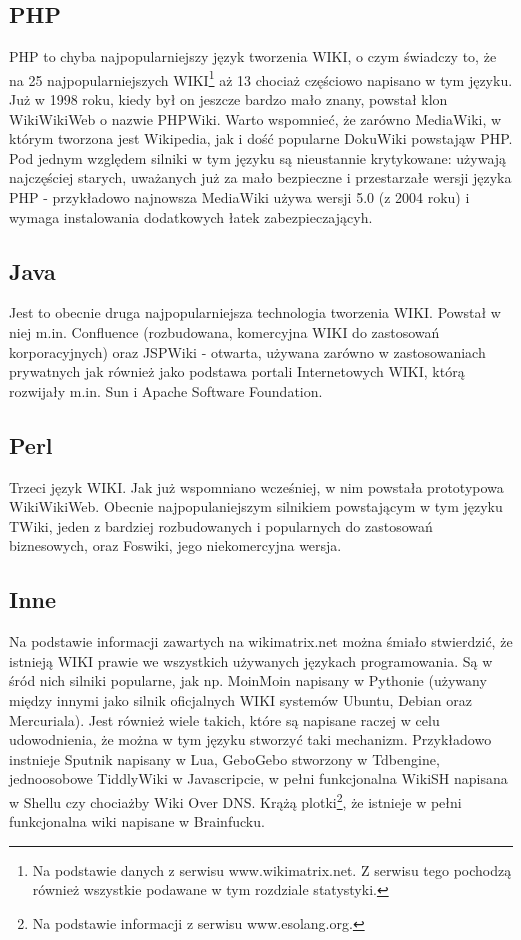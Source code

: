 \documentclass{article}
\begin{document}
	\subsection{PHP} 
	PHP to chyba najpopularniejszy język tworzenia WIKI, o czym świadczy to, że na 25 najpopularniejszych WIKI\footnote{Na podstawie danych z serwisu www.wikimatrix.net. Z serwisu tego pochodzą również wszystkie podawane w tym rozdziale statystyki.} aż 13 chociaż częściowo napisano w tym języku. Już w 1998 roku, kiedy był on jeszcze bardzo mało znany, powstał klon WikiWikiWeb o nazwie PHPWiki. Warto wspomnieć, że zarówno MediaWiki, w którym tworzona jest Wikipedia, jak i dość popularne DokuWiki powstająw PHP. Pod jednym względem silniki w tym języku są nieustannie krytykowane: używają najczęściej starych, uważanych już za mało bezpieczne i przestarzałe wersji języka PHP - przykładowo najnowsza MediaWiki używa wersji 5.0 (z 2004 roku) i wymaga instalowania dodatkowych łatek zabezpieczającyh.  
	\subsection{Java}
	Jest to obecnie druga najpopularniejsza technologia tworzenia WIKI. Powstał w niej m.in. Confluence (rozbudowana, komercyjna WIKI do zastosowań korporacyjnych) oraz JSPWiki - otwarta, używana zarówno w zastosowaniach prywatnych jak również jako podstawa portali Internetowych WIKI, którą rozwijały m.in. Sun i Apache Software Foundation.
	\subsection{Perl}
	Trzeci język WIKI. Jak już wspomniano wcześniej, w nim powstała prototypowa WikiWikiWeb. Obecnie najpopulaniejszym silnikiem powstającym w tym języku TWiki, jeden z bardziej rozbudowanych i popularnych do zastosowań biznesowych, oraz Foswiki, jego niekomercyjna wersja.  
	\subsection{Inne}
	Na podstawie informacji zawartych na wikimatrix.net można śmiało stwierdzić, że istnieją WIKI prawie we wszystkich używanych językach programowania. Są w śród nich silniki popularne, jak np. MoinMoin napisany w Pythonie (używany między innymi jako silnik oficjalnych WIKI systemów Ubuntu, Debian oraz Mercuriala). Jest również wiele takich, które są napisane raczej w celu udowodnienia, że można w tym języku stworzyć taki mechanizm. Przykładowo instnieje Sputnik napisany w Lua, GeboGebo stworzony w Tdbengine, jednoosobowe TiddlyWiki w Javascripcie, w pełni funkcjonalna WikiSH napisana w Shellu czy chociażby Wiki Over DNS. Krążą plotki\footnote{Na podstawie informacji z serwisu www.esolang.org.}, że istnieje w pełni funkcjonalna wiki napisane w Brainfucku. 	
\end{document}
